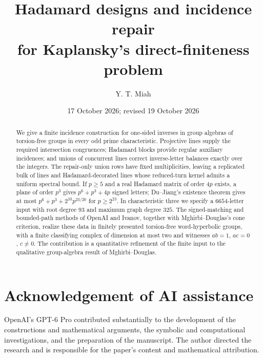 \documentclass[11pt,a4paper]{amsart}
\title[Hadamard designs and incidence repair]{Hadamard designs and incidence repair\\for Kaplansky's direct-finiteness problem}
\author{Y. T. Miah}
\date{17 October 2026; revised 19 October 2026}
\numberwithin{equation}{section}
\theoremstyle{definition}
\theoremstyle{remark}
\begin{document}
\begin{abstract}
We give a finite incidence construction for one-sided inverses in group algebras of torsion-free groups in every odd prime characteristic. Projective lines supply the required intersection congruences; Hadamard blocks provide regular auxiliary incidences; and unions of concurrent lines correct inverse-letter balances exactly over the integers. The repair-only union rows have fixed multiplicities, leaving a replicated bulk of lines and Hadamard-decorated lines whose reduced-turn kernel admits a uniform spectral bound. If $p\ge5$ and a real Hadamard matrix of order $4p$ exists, a plane of order $p^3$ gives $p^6+p^3+4p$ signed letters; Du--Jiang's existence theorem gives at most $p^6+p^3+2^{10}p^{23/20}$ for $p\ge2^{23}$. In characteristic three we specify a $6654$-letter input with root degree $93$ and maximum graph degree $325$. The signed-matching and bounded-path methods of OpenAI and Ivanov, together with Mghirbi--Douglas's cone criterion, realize these data in finitely presented torsion-free word-hyperbolic groups, with a finite classifying complex of dimension at most two and witnesses $ab=1$, $ac=0$, $c\ne0$. The contribution is a quantitative refinement of the finite input to the qualitative group-algebra result of Mghirbi--Douglas.
\end{abstract}
\maketitle
\tableofcontents
\clearpage








\par\bigskip\noindent\begin{minipage}{\textwidth}
\section*{Acknowledgement of AI assistance}
OpenAI's GPT-6 Pro contributed substantially to the development of the constructions and mathematical arguments, the symbolic and computational investigations, and the preparation of the manuscript. The author directed the research and is responsible for the paper's content and mathematical attribution.
\end{minipage}\par\medskip
\appendix






\end{document}
